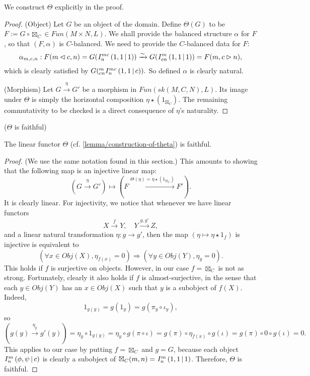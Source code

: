 \noindent We construct $\Theta$ explicitly in the proof.

\begin{proof}
  \noindent (Object) Let $G$ be an object of the domain. Define $\Theta(G)$ to
  be $F := G \circ \boxtimes_{C} \in Fun(M \times N, L)$. We shall provide the
  balanced structure $\alpha$ for $F$, so that $(F, \alpha)$ is $C$-balanced. 
  We need to provide the $C$-balanced data for $F$:
  \[
    \alpha_{m,c,n}: F(m \lhd c, n) =
    G({}^{}_{} I^{mc}_{n} \left( 1, 1 \,\middle|\, 1 \right))
    \xrightarrow{\sim} G({}^{}_{} I^{m}_{cn} \left( 1, 1 \,\middle|\, 1 \right))
    = F(m, c \rhd n),
  \]
  which is clearly satisfied by $G({}^{m}_{cn} I^{mc}_{n} \left( 1, 1 \,\middle|\, c \right)).$ So defined
  $\alpha$ is clearly natural.

  \noindent (Morphism) Let $G \xrightarrow{\eta} G'$ be a morphism in
  $Fun(sk(M,C,N), L)$. Its image under $\Theta$ is simply the horizontal
  composition $\eta \star (1_{\boxtimes_{C}})$. The remaining commutativity to be checked
  is a direct consequence of $\eta$'s naturality.
\end{proof}

\begin{lemma}\label{lemma/theta-is-faithful} ($\Theta$ is faithful)

  \noindent The linear functor $\Theta$ (cf. \ref{lemma/construction-of-theta}) is faithful.
\end{lemma}

\begin{proof}
  (We use the same notation found in this section.) This amounts to showing
  that the following map is an injective linear map:
  \[
    (G \xrightarrow{\eta} G') \mapsto (F \xrightarrow{\Theta(\eta) = \eta \star (1_{\boxtimes_{C}})} F').
  \]
  It is clearly linear. For injectivity, we notice that whenever we have
  linear functors
  \[
    X \xrightarrow{f} Y,\quad Y \xrightarrow{g, g'} Z,
  \]
  and a linear natural transformation $\eta: g \to g'$, then the map $(\eta \mapsto \eta \star 1_{f})$ is injective is equivalent to
  \[
    (\forall x \in Obj(X), \eta_{f(x)} = 0) \Rightarrow (\forall y \in Obj(Y), \eta_{y} = 0).
  \]
  This holds if $f$ is surjective on objects. However, in our case
  $f = \boxtimes_{C}$ is not as strong. Fortunately, clearly it also holds if
  $f$ is almost-surjective, in the sense that each $y \in Obj(Y)$ has an
  $x \in Obj(X)$ such that $y$ is a subobject of $f(X)$. Indeed,
  \[
    1_{g(y)} = g(1_{y}) = g(\pi_{y} \circ \iota_{y}),
  \]
  so
  \[
    (g(y) \xrightarrow{\eta_{y}} g'(y)) = \eta_{y} \circ 1_{g(y)} = \eta_{y} \circ g(\pi \circ \iota) = g(\pi) \circ \eta_{f(x)} \circ g(\iota) = g(\pi) \circ 0 \circ g(\iota) = 0.
  \]
  This applies to our case by putting $f = \boxtimes_{C}$ and $g = G$, because
  each object ${}^{}_{} I^{m}_{n} \left( \phi, \psi \,\middle|\, c \right)$ is clearly a subobject of
  $\boxtimes_{C}(m,n) = {}^{}_{} I^{m}_{n} \left( 1, 1 \,\middle|\, 1 \right)$. Therefore, $\Theta$ is faithful.
\end{proof}

